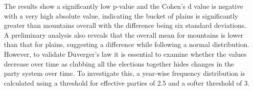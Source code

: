\vspace{0.3cm}

The results show a significantly low p-value and the Cohen's d value is negative with a very high absolute value, indicating the bucket of plains is significantly greater than mountains overall with the difference being six standard deviations. 
A preliminary analysis also reveals that the overall mean for mountains is lower than that for plains,  suggesting a difference while following a normal distribution. However, to validate Duverger's law it is essential to examine whether the values decrease over time as clubbing all the elections together hides changes in the party system over time. To investigate this, a year-wise frequency distribution is calculated using a threshold for effective parties of 2.5 and a softer threshold of 3.


